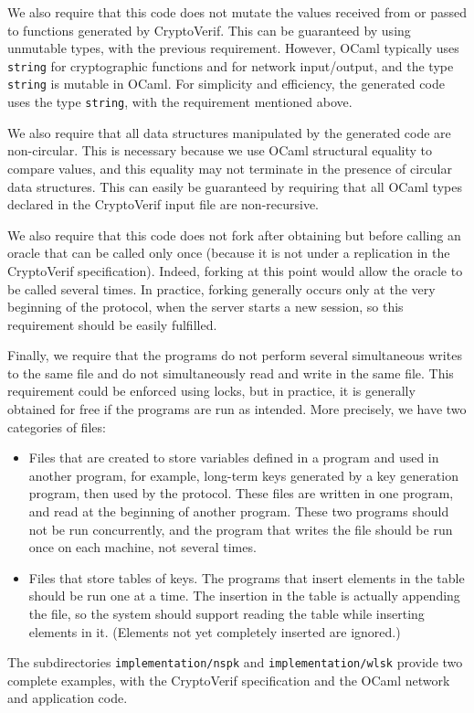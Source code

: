 \begin{itemize}
We also require that this code does not mutate the values received
from or passed to functions generated by CryptoVerif. This can be
guaranteed by using unmutable types, with the previous requirement.
However, OCaml typically uses \texttt{string} for cryptographic
functions and for network input/output, and the type \texttt{string}
is mutable in OCaml. For simplicity and efficiency, the generated 
code uses the type \texttt{string}, with the requirement mentioned above.

We also require that all data structures manipulated by the generated
code are non-circular. This is necessary because we use OCaml
structural equality to compare values, and this equality may not
terminate in the presence of circular data structures. This can easily
be guaranteed by requiring that all OCaml types declared in the
CryptoVerif input file are non-recursive.

We also require that this code does not fork after obtaining but
before calling an oracle that can be called only once (because it is
not under a replication in the CryptoVerif specification). Indeed,
forking at this point would allow the oracle to be called several times.
In practice, forking generally occurs only at the very beginning of the
protocol, when the server starts a new session, so this requirement
should be easily fulfilled.

Finally, we require that the programs do not perform several
simultaneous writes to the same file and do not simultaneously read
and write in the same file. This requirement could be enforced using
locks, but in practice, it is generally obtained for free if the
programs are run as intended. More precisely, we have two categories
of files:
\begin{itemize}

\item Files that are created to store variables defined in a program
and used in another program, for example, long-term keys generated by
a key generation program, then used by the protocol. These files are
written in one program, and read at the beginning of another
program. These two programs should not be run concurrently, and the
program that writes the file should be run once on each machine,
not several times.

\item Files that store tables of keys. The programs that insert elements 
in the table should be run one at a time. The insertion in the table
is actually appending the file, so the system should support reading the
table while inserting elements in it.  (Elements not yet completely
inserted are ignored.)

\end{itemize}

\end{itemize} 
The subdirectories \texttt{implementation/nspk} and
\texttt{implementation/wlsk} provide two complete examples,
with the CryptoVerif specification and the OCaml network and application
code.


